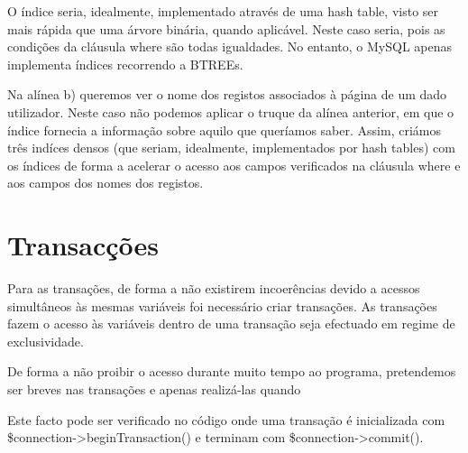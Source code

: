 \documentclass[11pt,a4paper]{article}
\begin{document}
 O índice seria, idealmente, implementado através de uma hash table, visto ser mais rápida que uma árvore binária, quando aplicável. Neste caso seria, pois as condições da cláusula where são todas igualdades. No entanto, o MySQL apenas implementa índices recorrendo a BTREEs.
 
Na alínea b) queremos ver o nome dos registos associados à página de um dado utilizador. Neste caso não podemos
aplicar o truque da alínea anterior, em que o índice fornecia a informação sobre aquilo que queríamos saber. Assim,
criámos três indíces densos (que seriam, idealmente, implementados por hash tables) com os índices de forma a
acelerar o acesso aos campos verificados na cláusula where e aos campos dos nomes dos registos.


\newpage

\section{Transacções}
Para as transações, de forma a não existirem incoerências devido a acessos simultâneos às mesmas variáveis foi necessário criar transações. As transações fazem o acesso às variáveis dentro de uma transação seja efectuado em regime de exclusividade.

De forma a não proibir o acesso durante muito tempo ao programa, pretendemos ser breves nas transações e apenas realizá-las quando 

Este facto pode ser verificado no código onde uma transação é inicializada com \$connection->beginTransaction() e terminam com \$connection->commit().
\end{document}
